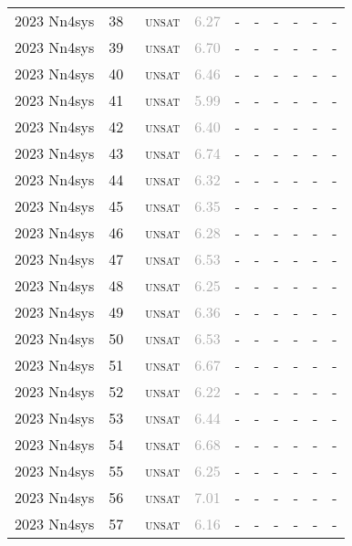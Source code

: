 \begin{center}
{\begin{longtable}{@{}llllllllll@{}}
2023 Nn4sys & 38 & ~\textsc{unsat} & \textcolor{darkgray}{6.27} & - & - & - & - & - & - \\
2023 Nn4sys & 39 & ~\textsc{unsat} & \textcolor{darkgray}{6.70} & - & - & - & - & - & - \\
2023 Nn4sys & 40 & ~\textsc{unsat} & \textcolor{darkgray}{6.46} & - & - & - & - & - & - \\
2023 Nn4sys & 41 & ~\textsc{unsat} & \textcolor{darkgray}{5.99} & - & - & - & - & - & - \\
2023 Nn4sys & 42 & ~\textsc{unsat} & \textcolor{darkgray}{6.40} & - & - & - & - & - & - \\
2023 Nn4sys & 43 & ~\textsc{unsat} & \textcolor{darkgray}{6.74} & - & - & - & - & - & - \\
2023 Nn4sys & 44 & ~\textsc{unsat} & \textcolor{darkgray}{6.32} & - & - & - & - & - & - \\
2023 Nn4sys & 45 & ~\textsc{unsat} & \textcolor{darkgray}{6.35} & - & - & - & - & - & - \\
2023 Nn4sys & 46 & ~\textsc{unsat} & \textcolor{darkgray}{6.28} & - & - & - & - & - & - \\
2023 Nn4sys & 47 & ~\textsc{unsat} & \textcolor{darkgray}{6.53} & - & - & - & - & - & - \\
2023 Nn4sys & 48 & ~\textsc{unsat} & \textcolor{darkgray}{6.25} & - & - & - & - & - & - \\
2023 Nn4sys & 49 & ~\textsc{unsat} & \textcolor{darkgray}{6.36} & - & - & - & - & - & - \\
2023 Nn4sys & 50 & ~\textsc{unsat} & \textcolor{darkgray}{6.53} & - & - & - & - & - & - \\
2023 Nn4sys & 51 & ~\textsc{unsat} & \textcolor{darkgray}{6.67} & - & - & - & - & - & - \\
2023 Nn4sys & 52 & ~\textsc{unsat} & \textcolor{darkgray}{6.22} & - & - & - & - & - & - \\
2023 Nn4sys & 53 & ~\textsc{unsat} & \textcolor{darkgray}{6.44} & - & - & - & - & - & - \\
2023 Nn4sys & 54 & ~\textsc{unsat} & \textcolor{darkgray}{6.68} & - & - & - & - & - & - \\
2023 Nn4sys & 55 & ~\textsc{unsat} & \textcolor{darkgray}{6.25} & - & - & - & - & - & - \\
2023 Nn4sys & 56 & ~\textsc{unsat} & \textcolor{darkgray}{7.01} & - & - & - & - & - & - \\
2023 Nn4sys & 57 & ~\textsc{unsat} & \textcolor{darkgray}{6.16} & - & - & - & - & - & - \\

\end{longtable}}
\end{center}
